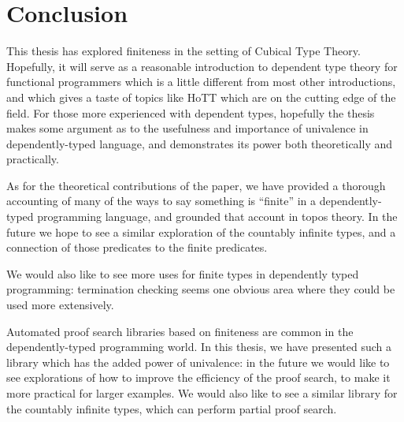 \chapter{Conclusion}
This thesis has explored finiteness in the setting of Cubical Type Theory.
Hopefully, it will serve as a reasonable introduction to dependent type theory
for functional programmers which is a little different from most other
introductions, and which gives a taste of topics like HoTT which are on the
cutting edge of the field.
For those more experienced with dependent types, hopefully the thesis makes some
argument as to the usefulness and importance of univalence in dependently-typed
language, and demonstrates its power both theoretically and practically.

As for the theoretical contributions of the paper, we have provided a thorough
accounting of many of the ways to say something is ``finite'' in a
dependently-typed programming language, and grounded that account in topos
theory.
In the future we hope to see a similar exploration of the countably infinite
types, and a connection of those predicates to the finite predicates.

We would also like to see more uses for finite types in dependently typed
programming: termination checking seems one obvious area where they could be
used more extensively.

Automated proof search libraries based on finiteness are common in the
dependently-typed programming world.
In this thesis, we have presented such a library which has the added power of
univalence: in the future we would like to see explorations of how to improve
the efficiency of the proof search, to make it more practical for larger
examples.
We would also like to see a similar library for the countably infinite types,
which can perform partial proof search.

